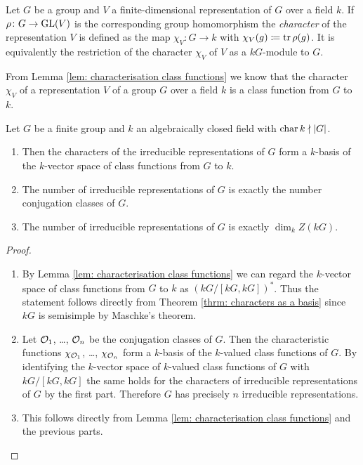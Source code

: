 \begin{defi}
  Let $G$ be a group and $V$ a finite-dimensional representation of $G$ over a field $k$. If $\rho \colon G \to \operatorname{GL}(V)$ is the corresponding group homomorphism the \emph{character} of the representation $V$ is defined as the map $\chi_V \colon G \to k$ with $\chi_V(g) \coloneqq \operatorname{tr} \rho(g)$. It is equivalently the restriction of the character $\chi_V$ of $V$ as a $kG$-module to $G$.
\end{defi}


From Lemma \ref{lem: characterisation class functions} we know that the character $\chi_V$ of a representation $V$ of a group $G$ over a field $k$ is a class function from $G$ to $k$.


\begin{prop} \label{prop: conjugation classes and irreducible representations}
  Let $G$ be a finite group and $k$ an algebraically closed field with $\operatorname{char} k \nmid |G|$.
  \begin{enumerate}[label=\emph{\alph*)}, leftmargin=*]
    \item
      Then the characters of the irreducible representations of $G$ form a $k$-basis of the $k$-vector space of class functions from $G$ to $k$.
    \item
      The number of irreducible representations of $G$ is exactly the number conjugation classes of $G$.
    \item
      The number of irreducible representations of $G$ is exactly $\dim_k Z(kG)$.
  \end{enumerate}
\end{prop}
\begin{proof}
  \begin{enumerate}[label=\emph{\alph*)}, leftmargin=*]
    \item
      By Lemma \ref{lem: characterisation class functions} we can regard the $k$-vector space of class functions from $G$ to $k$ as $(kG/[kG,kG])^*$.
      Thus the statement follows directly from Theorem \ref{thrm: characters as a basis} since $kG$ is semisimple by Maschke’s theorem.
    \item
      Let $\mathcal{O}_1$, \dots, $\mathcal{O}_n$ be the conjugation classes of $G$.
      Then the characteristic functions $\chi_{\mathcal{O}_1}$, \dots, $\chi_{\mathcal{O}_n}$ form a $k$-basis of the $k$-valued class functions of $G$.
      By identifying the $k$-vector space of $k$-valued class functions of $G$ with $kG/[kG,kG]$ the same holds for the characters of irreducible representations of $G$ by the first part.
      Therefore $G$ has precisely $n$ irreducible representations.
    \item
      This follows directly from Lemma \ref{lem: characterisation class functions} and the previous parts.
  \end{enumerate}
\end{proof}



